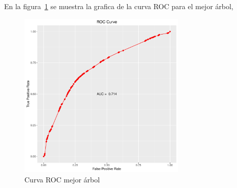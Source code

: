 En la figura~\ref{fig:3c} se muestra la grafica de la curva ROC para el mejor árbol,

\begin{figure}
  \centering
  \includegraphics[width = 8cm]{3c.pdf}
  \caption{Curva ROC mejor árbol}
  \label{fig:3c}
\end{figure}


